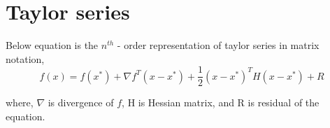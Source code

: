 \section{Taylor series}
Below equation is the $n^{th}$ - order representation of taylor series in matrix notation,
\begin{equation}
    \boxed{
    f(x) = f(x^*) + \nabla f^T (x - x^*) + \frac{1}{2} (x - x^*)^T H (x - x ^*) + R 
    }
    \label{Taylor_equation}
\end{equation}

where, $\nabla$ is divergence of $f$, H is Hessian matrix, and R is residual of the equation.